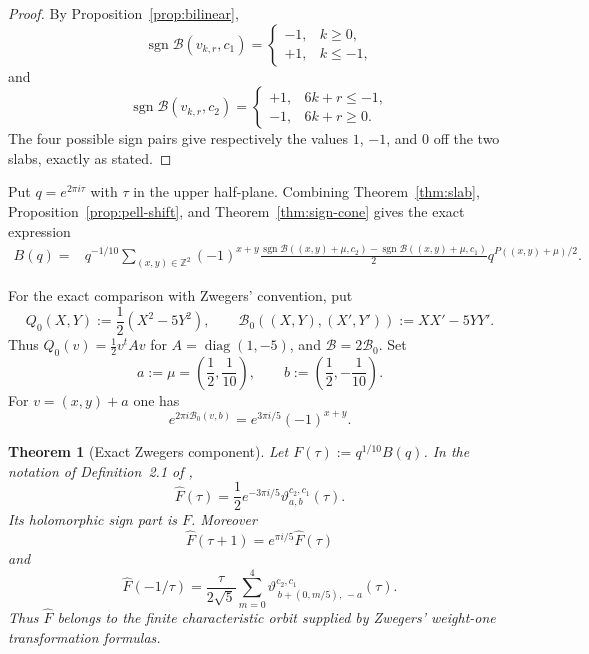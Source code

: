 \documentclass[12pt]{amsart}
\newtheorem{theorem}{Theorem}[section]
\theoremstyle{definition}
\theoremstyle{remark}
\DeclareMathOperator{\sgn}{sgn}
\newcommand{\ZZ}{\mathbb{Z}}
\begin{document}
\begin{proof}
By Proposition~\ref{prop:bilinear},
\[
  \sgn\mathcal B(v_{k,r},c_1)=
  \begin{cases}
    -1,&k\geq0,\\
    +1,&k\leq-1,
  \end{cases}
\]
and
\[
  \sgn\mathcal B(v_{k,r},c_2)=
  \begin{cases}
    +1,&6k+r\leq-1,\\
    -1,&6k+r\geq0.
  \end{cases}
\]
The four possible sign pairs give respectively the values $1$, $-1$,
and $0$ off the two slabs, exactly as stated.
\end{proof}

Put $q=e^{2\pi i\tau}$ with $\tau$ in the upper half-plane.  Combining
Theorem~\ref{thm:slab}, Proposition~\ref{prop:pell-shift}, and
Theorem~\ref{thm:sign-cone} gives the exact expression
\begin{align}
  B(q)
  ={}&q^{-1/10}
  \sum_{(x,y)\in\ZZ^2}(-1)^{x+y}
  \frac{\sgn\mathcal B((x,y)+\mu,c_2)
       -\sgn\mathcal B((x,y)+\mu,c_1)}2
  q^{P((x,y)+\mu)/2}.
  \label{eq:zwegers-series}
\end{align}

For the exact comparison with Zwegers' convention, put
\[
  Q_0(X,Y):=\frac12(X^2-5Y^2),
  \qquad
  \mathcal B_0((X,Y),(X',Y')):=XX'-5YY'.
\]
Thus $Q_0(v)=\tfrac12v^tAv$ for
$A=\operatorname{diag}(1,-5)$, and
$\mathcal B=2\mathcal B_0$.  Set
\[
  a:=\mu=\left(\frac12,\frac1{10}\right),
  \qquad
  b:=\left(\frac12,-\frac1{10}\right).
\]
For $v=(x,y)+a$ one has
\begin{equation}\label{eq:characteristic-phase}
  e^{2\pi i\mathcal B_0(v,b)}
  =e^{3\pi i/5}(-1)^{x+y}.
\end{equation}

\begin{theorem}[Exact Zwegers component]\label{thm:zwegers-identification}
Let $F(\tau):=q^{1/10}B(q)$.  In the notation of Definition~2.1 of
\cite{oZw02},
\begin{equation}\label{eq:exact-completion}
  \widehat F(\tau)
  =\frac12e^{-3\pi i/5}
    \vartheta_{a,b}^{c_2,c_1}(\tau).
\end{equation}
Its holomorphic sign part is $F$.  Moreover
\begin{equation}\label{eq:T-transform}
  \widehat F(\tau+1)=e^{\pi i/5}\widehat F(\tau)
\end{equation}
and
\begin{equation}\label{eq:S-transform}
  \widehat F(-1/\tau)
  =\frac{\tau}{2\sqrt5}\sum_{m=0}^{4}
    \vartheta_{\,b+(0,m/5),\,-a}^{c_2,c_1}(\tau).
\end{equation}
Thus $\widehat F$ belongs to the finite characteristic orbit supplied
by Zwegers' weight-one transformation formulas.
\end{theorem}
\end{document}
